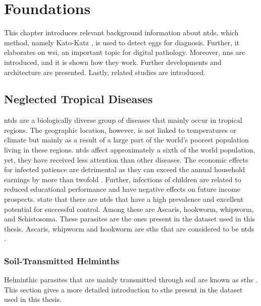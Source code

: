 \chapter{Foundations}
\label{ch:Foundations}

This chapter introduces relevant background information about \acfp{ntd}, which method, namely Kato-Katz \cite{katz1972simple}, is used to detect eggs for diagnosis. Further, it elaborates on \acf{wsi}, an important topic for digital pathology. Moreover, \acfp{nn} are introduced, and it is shown how they work. Further developments and architecture are presented. Lastly, related studies are introduced.

\section{Neglected Tropical Diseases}
\label{sec:Foundations:NTDs}

\Acfp{ntd} \cite{feasey2010neglected} are a biologically diverse group of diseases that mainly occur in tropical regions. The geographic location, however, is not linked to temperatures or climate but mainly as a result of a large part of the world's poorest population living in these regions. \Acp{ntd} affect approximately a sixth of the world population, yet, they have received less attention than other diseases. The economic effects for infected patience are detrimental as they can exceed the annual household earnings by more than twofold \cite{conteh2010socioeconomic}. Further, infections of children are related to reduced educational performance and have negative effects on future income prospects. \textcite{feasey2010neglected} state that there are \acp{ntd} that have a high prevalence and excellent potential for successful control. Among these are Ascaris, hookworm, whipworm, and Schistosoma. These parasites are the ones present in the dataset used in this thesis. Ascaris, whipworm and hookworm are \acfp{sth} that are considered to be \acp{ntd} \cite{mbongngwese2020diagnostic}. 


\subsection{Soil-Transmitted Helminths} %
\label{sec:Foundations:NTDs:STHs} 

Helminthic parasites that are mainly transmitted through soil are known as \acfp{sth} \cite{feasey2010neglected,jourdan2018soiltransmitted}. This section gives a more detailed introduction to \acp{sth} present in the dataset used in this thesis.


